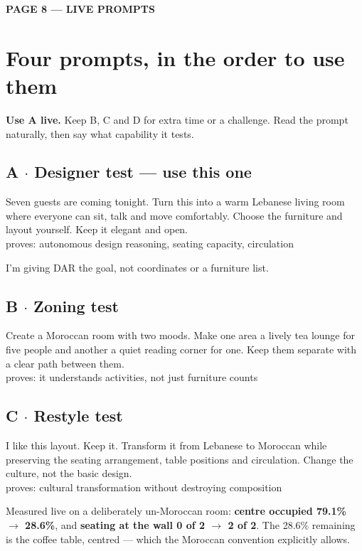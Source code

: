 \documentclass[10.5pt,a4paper]{article}
\newcommand{\pagelabel}[2]{%
  {\sffamily\bfseries\scriptsize\color{brass}\MakeUppercase{Page #1 --- #2}}\par\vspace{0.2em}}
\newcommand{\tests}[1]{{\footnotesize\ttfamily\color{muted}#1}}
\begin{document}
\newpage
\pagelabel{8}{live prompts}
\section*{Four prompts, in the order to use them}

\textbf{Use A live.} Keep B, C and D for extra time or a challenge. Read the prompt naturally, then
say what capability it tests.

\subsection*{A $\cdot$ Designer test --- use this one}
\begin{prompt}
Seven guests are coming tonight. Turn this into a warm Lebanese living room where everyone can sit,
talk and move comfortably. Choose the furniture and layout yourself. Keep it elegant and open.\\[3pt]
\tests{proves: autonomous design reasoning, seating capacity, circulation}
\end{prompt}
\begin{sayit}[Introduce it]
I'm giving DAR the goal, not coordinates or a furniture list.
\end{sayit}

\subsection*{B $\cdot$ Zoning test}
\begin{prompt}
Create a Moroccan room with two moods. Make one area a lively tea lounge for five people and another
a quiet reading corner for one. Keep them separate with a clear path between them.\\[3pt]
\tests{proves: it understands activities, not just furniture counts}
\end{prompt}

\subsection*{C $\cdot$ Restyle test}
\begin{prompt}
I like this layout. Keep it. Transform it from Lebanese to Moroccan while preserving the seating
arrangement, table positions and circulation. Change the culture, not the basic design.\\[3pt]
\tests{proves: cultural transformation without destroying composition}
\end{prompt}
\begin{strength}
Measured live on a deliberately un-Moroccan room: \textbf{centre occupied 79.1\% $\rightarrow$
28.6\%}, and \textbf{seating at the wall 0 of 2 $\rightarrow$ 2 of 2}. The 28.6\% remaining is the
coffee table, centred --- which the Moroccan convention explicitly allows.
\end{strength}
\end{document}
